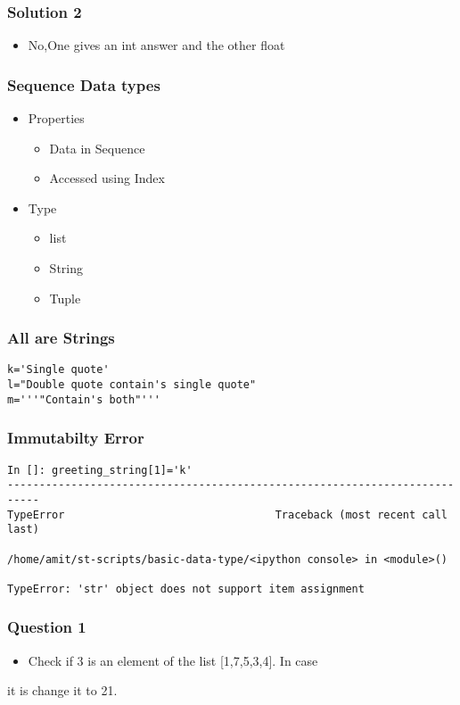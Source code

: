 \documentclass[presentation]{beamer}
\begin{document}
\begin{frame}
\frametitle{Solution 2}
\label{sec-11}

\begin{itemize}
\item No,One gives an int answer and the other float
\end{itemize}
\end{frame}
\begin{frame}
\frametitle{Sequence Data types}
\label{sec-12}
\begin{itemize}

\item Properties
\label{sec-12_1}%
\begin{itemize}
\item Data in Sequence
\item Accessed using Index
\end{itemize}


\item Type
\label{sec-12_2}%
\begin{itemize}
\item list
\item String
\item Tuple
\end{itemize}


\end{itemize} %
\end{frame}
\begin{frame}[fragile]
\frametitle{All are Strings}
\label{sec-13}

\begin{verbatim}
k='Single quote'
l="Double quote contain's single quote"
m='''"Contain's both"'''
\end{verbatim}
\end{frame}
\begin{frame}[fragile]
\frametitle{Immutabilty Error}
\label{sec-14}

\begin{verbatim}
In []: greeting_string[1]='k'
---------------------------------------------------------------------------
TypeError                                 Traceback (most recent call       last)

/home/amit/st-scripts/basic-data-type/<ipython console> in <module>()

TypeError: 'str' object does not support item assignment
\end{verbatim}
\end{frame}
\begin{frame}
\frametitle{Question 1}
\label{sec-15}

\begin{itemize}
\item Check if 3 is an element of the list [1,7,5,3,4]. In case
\end{itemize}

it is change it to 21.
\end{frame}
\end{document}
